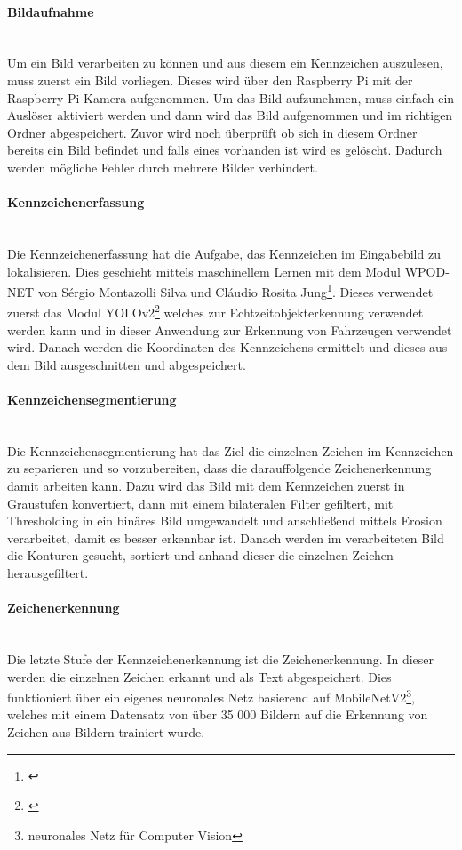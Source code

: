 \paragraph{Bildaufnahme}\mbox{}\\
Um ein Bild verarbeiten zu können und aus diesem ein Kennzeichen auszulesen, muss zuerst ein Bild vorliegen. 
Dieses wird über den Raspberry Pi mit der Raspberry Pi-Kamera aufgenommen. Um das Bild aufzunehmen, muss einfach ein Auslöser 
aktiviert werden und dann wird das Bild aufgenommen und im richtigen Ordner abgespeichert. Zuvor wird noch überprüft ob 
sich in diesem Ordner bereits ein Bild befindet und falls eines vorhanden ist wird es gelöscht. Dadurch werden mögliche Fehler 
durch mehrere Bilder verhindert.

\paragraph{Kennzeichenerfassung}\mbox{}\\
Die Kennzeichenerfassung hat die Aufgabe, das Kennzeichen im Eingabebild zu lokalisieren. Dies geschieht mittels maschinellem Lernen 
mit dem Modul WPOD-NET von Sérgio Montazolli Silva und Cláudio Rosita Jung\footnote{\cite{wpodnet}}. Dieses verwendet zuerst das Modul YOLOv2\footnote{\cite{YOLO9000}} welches zur 
Echtzeitobjekterkennung verwendet werden kann und in dieser Anwendung zur Erkennung von Fahrzeugen verwendet wird. Danach werden 
die Koordinaten des Kennzeichens ermittelt und dieses aus dem Bild ausgeschnitten und abgespeichert.

\paragraph{Kennzeichensegmentierung}\mbox{}\\
Die Kennzeichensegmentierung hat das Ziel die einzelnen Zeichen im Kennzeichen zu separieren und so vorzubereiten, dass die 
darauffolgende Zeichenerkennung damit arbeiten kann. Dazu wird das Bild mit dem Kennzeichen zuerst in Graustufen konvertiert, 
dann mit einem bilateralen Filter gefiltert, mit Thresholding in ein binäres Bild umgewandelt und anschließend mittels Erosion verarbeitet, damit es besser erkennbar ist. Danach werden im verarbeiteten Bild die Konturen gesucht, sortiert und anhand dieser die einzelnen Zeichen herausgefiltert.

\paragraph{Zeichenerkennung}\mbox{}\\
Die letzte Stufe der Kennzeichenerkennung ist die Zeichenerkennung. In dieser werden die einzelnen Zeichen erkannt und als Text 
abgespeichert. Dies funktioniert über ein eigenes neuronales Netz basierend auf MobileNetV2\footnote{neuronales Netz für Computer Vision}, welches mit einem Datensatz von 
über 35 000 Bildern auf die Erkennung von Zeichen aus Bildern trainiert wurde.

